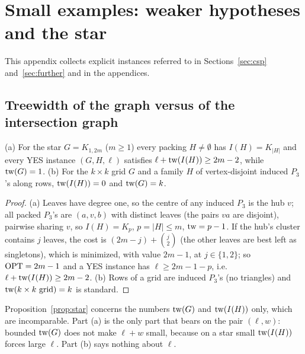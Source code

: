 \section{Small examples: weaker hypotheses and the star}\label{app:examples}
This appendix collects explicit instances referred to in Sections~\ref{sec:csp} and~\ref{sec:further} and in the appendices.
\subsection{Treewidth of the graph versus of the intersection graph}
\begin{proposition}\label{prop:star}
(a) For the star $G=K_{1,2m}$ ($m\ge1$) every packing $H\ne\emptyset$ has $I(H)=K_{|H|}$ and every YES instance $(G,H,\ell)$ satisfies $\ell+\mathrm{tw}(I(H))\ge 2m-2$, while $\mathrm{tw}(G)=1$. (b) For the $k\times k$ grid $G$ and a family $H$ of vertex-disjoint induced $P_3$'s along rows, $\mathrm{tw}(I(H))=0$ and $\mathrm{tw}(G)=k$.
\end{proposition}
\begin{proof}
(a) Leaves have degree one, so the centre of any induced $P_3$ is the hub $v$; all packed $P_3$'s are $(a,v,b)$ with distinct leaves (the pairs $va$ are disjoint), pairwise sharing $v$, so $I(H)=K_p$, $p=|H|\le m$, $\mathrm{tw}=p-1$. If the hub's cluster contains $j$ leaves, the cost is $(2m-j)+\binom j2$ (the other leaves are best left as singletons), which is minimized, with value $2m-1$, at $j\in\{1,2\}$; so $\mathrm{OPT}=2m-1$ and a YES instance has $\ell\ge 2m-1-p$, i.e.\ $\ell+\mathrm{tw}(I(H))\ge 2m-2$. (b) Rows of a grid are induced $P_3$'s (no triangles) and $\mathrm{tw}(k\times k\text{ grid})=k$ is standard.
\end{proof}
Proposition~\ref{prop:star} concerns the numbers $\mathrm{tw}(G)$ and $\mathrm{tw}(I(H))$ only, which are incomparable. Part (a) is the only part that bears on the pair $(\ell,w)$: bounded $\mathrm{tw}(G)$ does not make $\ell+w$ small, because on a star small $\mathrm{tw}(I(H))$ forces large $\ell$. Part (b) says nothing about $\ell$.

